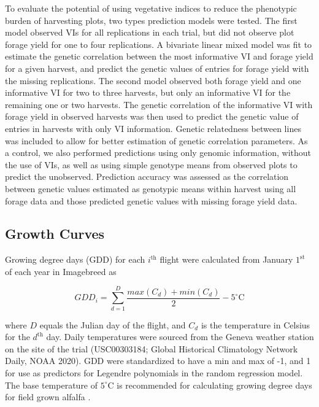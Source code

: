 \documentclass[12pt, letterpaper]{article}
\begin{document}

To evaluate the potential of using vegetative indices to reduce the phenotypic burden of harvesting plots, two types prediction models were tested. The first model observed VIs for all replications in each trial, but did not observe plot forage yield for one to four replications. A bivariate linear mixed model was fit to estimate the genetic correlation between the most informative VI and forage yield for a given harvest, and predict the genetic values of entries for forage yield with the missing replications. The second model observed both forage yield and one informative VI for two to three harvests, but only an informative VI for the remaining one or two harvests. The genetic correlation of the informative VI with forage yield in observed harvests was then used to predict the genetic value of entries in harvests with only VI information. Genetic relatedness between lines was included to allow for better estimation of genetic correlation parameters. As a control, we also performed predictions using only genomic information, without the use of VIs, as well as using simple genotype means from observed plots to predict the unobserved.  Prediction accuracy was assessed as the correlation between genetic values estimated as genotypic means within harvest using all forage data and those predicted genetic values with missing forage yield data.

\subsection{Growth Curves}

Growing degree days (GDD) for each $i^\text{th}$ flight were calculated from January $1^\text{st}$ of each year in Imagebreed as 

\begin{equation} \label{gdd}
GDD_i = \sum^D_{d = 1} \frac{max(C_d) + min(C_d)}{2} - 5^\circ \text{C}
\end{equation}

\noindent where $D$ equals the Julian day of the flight, and $C_d$ is the temperature in Celsius for the $d^\text{th}$ day. Daily temperatures were sourced from the Geneva weather station on the site of the trial (USC00303184; Global Historical Climatology Network Daily, NOAA 2020). GDD were standardized to have a min and max of -1, and 1 for use as predictors for Legendre polynomials in the random regression model. The base temperature of $5^\circ \text{C}$ is recommended for calculating growing degree days for field grown alfalfa \parencite{sharratt1989}.
\end{document}
